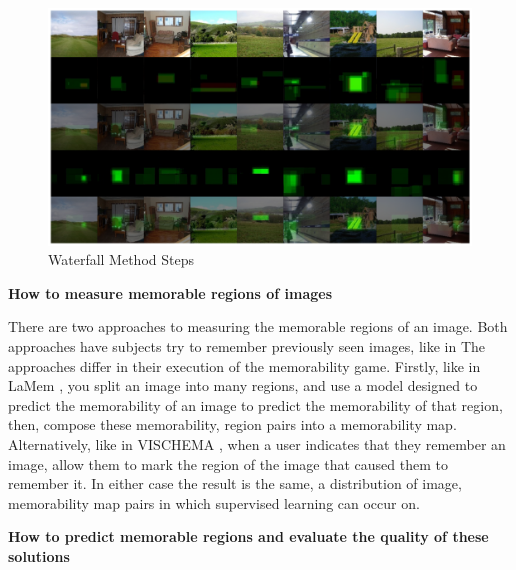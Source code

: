 \documentclass{UoYCSproject}
\begin{document}
\begin{figure}[ht]
    \centering
    \includegraphics[width=\linewidth]{Best GAN Outputs} %
    \caption{Waterfall Method Steps}
    \label{fig:waterfall method}
\end{figure}

\textbf{How to measure memorable regions of images}

There are two approaches to measuring the memorable regions of an image. Both approaches have subjects try to remember previously seen images, like in
The approaches differ in their execution of the memorability game. Firstly, like in LaMem \cite{ICCV15_Khosla}, you split an image into many regions, and use a model designed to predict the memorability of an image to predict the memorability of that region, then, compose these memorability, region pairs into a memorability map. 
Alternatively, like in VISCHEMA \cite{VischemaPaper}, when a user indicates that they remember an image, allow them to mark the region of the image that caused them to remember it. 
In either case the result is the same, a distribution of image, memorability map pairs in which supervised learning can occur on.

\textbf{How to predict memorable regions and evaluate the quality of these solutions}
\end{document}
